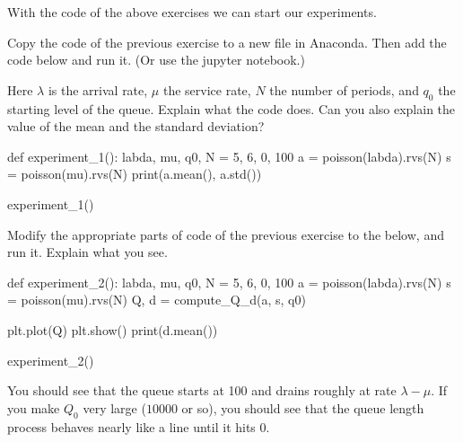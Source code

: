 With the code of the above exercises we can start our experiments.

\begin{exercise}\label{ex:4}
  Copy the code of the previous exercise to a new file in Anaconda.
  Then add the code below and run it. (Or use the jupyter notebook.)

  Here $\lambda$ is the arrival rate, $\mu$ the service rate, $N$ the number of periods, and $q_0$ the starting level of the queue.
  Explain what the code does.
  Can you also explain the value of the mean and the standard deviation?

\begin{pyverbatim}
def experiment_1():
    labda, mu, q0, N = 5, 6, 0, 100
    a = poisson(labda).rvs(N)
    s = poisson(mu).rvs(N)
    print(a.mean(), a.std())


experiment_1()
\end{pyverbatim}

\end{exercise}

\begin{exercise}
  Modify  the appropriate parts of  code of the previous exercise to the below,  and run it. Explain what you see.

\begin{pyverbatim}
def experiment_2():
    labda, mu, q0, N = 5, 6, 0, 100
    a = poisson(labda).rvs(N)
    s = poisson(mu).rvs(N)
    Q, d = compute_Q_d(a, s, q0)

    plt.plot(Q)
    plt.show()
    print(d.mean())


experiment_2()
\end{pyverbatim}

\begin{solution}
  You should see that the queue starts at 100 and drains roughly at rate $\lambda-\mu$.
  If you make $Q_0$ very large ($10 000$ or so), you should see that the queue length process behaves nearly like a line until it hits 0.
\end{solution}
\end{exercise}



